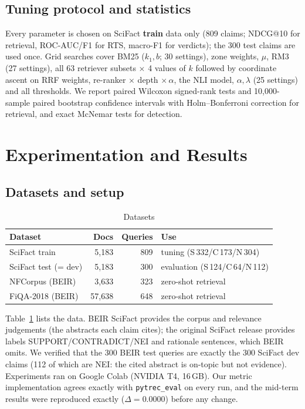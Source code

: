 \documentclass[conference]{IEEEtran}
\begin{document}
\subsection{Tuning protocol and statistics}
Every parameter is chosen on SciFact \textbf{train} data only (809 claims; NDCG@10 for retrieval, ROC-AUC/F1 for RTS,
macro-F1 for verdicts); the 300 test claims are used once. Grid searches cover BM25 ($k_1,b$; 30 settings), zone weights,
$\mu$, RM3 (27 settings), all 63 retriever subsets $\times$ 4 values of $k$ followed by coordinate ascent on RRF weights,
re-ranker $\times$ depth $\times\,\alpha$, the NLI model, $\alpha,\lambda$ (25 settings) and all thresholds. We report paired
Wilcoxon signed-rank tests and 10,000-sample paired bootstrap confidence intervals with Holm--Bonferroni correction for
retrieval, and exact McNemar tests for detection.

\section{Experimentation and Results}
\subsection{Datasets and setup}
\begin{table}[t]
\centering
\caption{Datasets}
\label{tab:data}
\footnotesize
\setlength{\tabcolsep}{3pt}
\begin{tabular}{@{}lrrl@{}}
\toprule
Dataset & Docs & Queries & Use \\
\midrule
SciFact train & 5,183 & 809 & tuning (S\,332/C\,173/N\,304) \\
SciFact test (= dev) & 5,183 & 300 & evaluation (S\,124/C\,64/N\,112) \\
NFCorpus (BEIR) & 3,633 & 323 & zero-shot retrieval \\
FiQA-2018 (BEIR) & 57,638 & 648 & zero-shot retrieval \\
\bottomrule
\end{tabular}
\end{table}
Table~\ref{tab:data} lists the data. BEIR SciFact provides the corpus and relevance judgements (the abstracts each claim
cites); the original SciFact release provides labels SUPPORT/CONTRADICT/NEI and rationale sentences, which BEIR omits. We
verified that the 300 BEIR test queries are exactly the 300 SciFact dev claims (112 of which are NEI: the cited abstract is
on-topic but not evidence). Experiments ran on Google Colab (NVIDIA T4, 16\,GB). Our metric implementation agrees exactly
with \texttt{pytrec\_eval} on every run, and the mid-term results were reproduced exactly ($\Delta=0.0000$) before any change.
\end{document}
